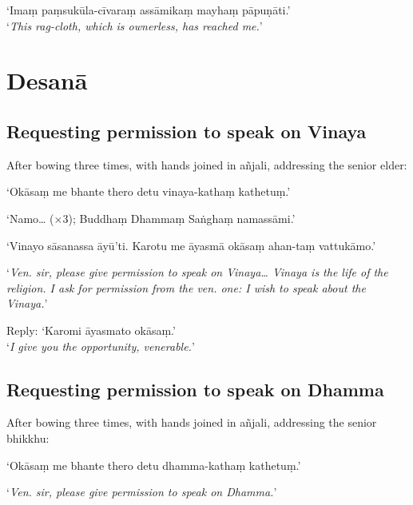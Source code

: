 ‘Imaṃ paṃsukūla-cīvaraṃ assāmikaṃ mayhaṃ pāpuṇāti.’\\
‘\emph{This rag-cloth, which is ownerless, has reached me.}’

\ifhandbookedition
\clearpage
\fi

\section{Desanā}

\subsection[Permission to speak on Vinaya]{Requesting permission to speak on Vinaya}

\vspace*{-0.5\baselineskip}

\begin{instruction}
  After bowing three times, with hands joined in añjali, addressing the senior
  elder:
\end{instruction}

‘Okāsaṃ me bhante thero detu vinaya-kathaṃ kathetuṃ.’

‘Namo… (×3); Buddhaṃ Dhammaṃ Saṅghaṃ namassāmi.’

‘Vinayo sāsanassa āyū'ti. Karotu me āyasmā okāsaṃ ahan-taṃ vattukāmo.’

‘\emph{Ven. sir, please give permission to speak on Vinaya… Vinaya is the life
  of the religion. I ask for permission from the ven. one: I wish to speak about
  the Vinaya.}’

Reply: ‘Karomi āyasmato okāsaṃ.’\\
‘\emph{I give you the opportunity, venerable.}’ 

\subsection[Permission to speak on Dhamma]{Requesting permission to speak on Dhamma}

\vspace*{-0.5\baselineskip}

\begin{instruction}
  After bowing three times, with hands joined in añjali, addressing the senior
  bhikkhu:
\end{instruction}

‘Okāsaṃ me bhante thero detu dhamma-kathaṃ kathetuṃ.’

‘\emph{Ven. sir, please give permission to speak on Dhamma.}’

